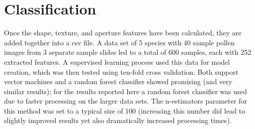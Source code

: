 \section{Classification}

Once the shape, texture, and aperture features have been calculated, they are added together into a csv file. A data set of 5 species with 40 sample pollen images from 3 separate sample slides led to a total of 600 samples, each with 252 extracted features. A supervised learning process used this data for model creation, which was then tested using ten-fold cross validation. Both support vector machines and a random forest classifier showed promising (and very similar results); for the results reported here a random forest classifier was used due to faster processing on the larger data sets. The n-estimators parameter for this method was set to a typical size of 100 (increasing this number did lead to slightly improved results yet also dramatically increased processing times).
    
  
  
  
  